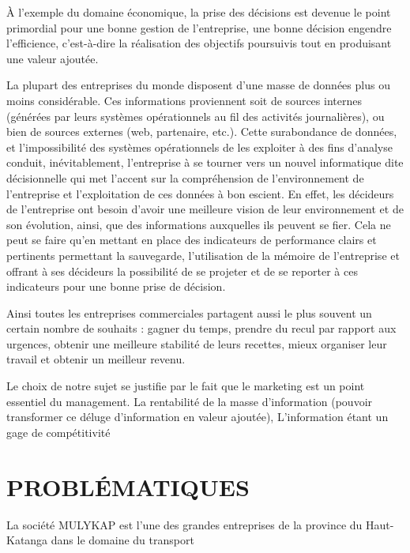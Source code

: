 \documentclass[a4paper,12pt,oneside]{book}
\begin{document}
        À l’exemple du domaine
        économique, la prise des décisions est devenue
        le point primordial pour une bonne gestion de
        l’entreprise, une bonne décision engendre l’efficience,
        c’est-à-dire la réalisation des objectifs
        poursuivis tout en produisant une valeur ajoutée.
        \newline

        La plupart des entreprises du monde disposent d’une masse de données plus ou
        moins considérable. Ces informations proviennent soit de sources internes (générées par
        leurs systèmes opérationnels au fil des activités journalières), ou bien de sources externes
        (web, partenaire, etc.). Cette surabondance de données, et l’impossibilité des systèmes
        opérationnels de les exploiter à des fins d’analyse conduit, inévitablement, l’entreprise à se
        tourner vers un nouvel informatique dite décisionnelle qui met l’accent sur la
        compréhension de l’environnement de l’entreprise et l’exploitation de ces données à bon
        escient. En effet, les décideurs de l’entreprise ont besoin d’avoir une meilleure vision de
        leur environnement et de son évolution, ainsi, que des informations auxquelles ils peuvent
        se fier. Cela ne peut se faire qu’en mettant en place des indicateurs de performance clairs
        et pertinents permettant la sauvegarde, l’utilisation de la mémoire de l’entreprise et offrant
        à ses décideurs la possibilité de se projeter et de se reporter à ces indicateurs pour une bonne
        prise de décision.
        \newline

        Ainsi toutes les entreprises commerciales partagent aussi
        le plus souvent un certain nombre de souhaits : gagner
        du temps, prendre du recul par rapport aux urgences, obtenir une meilleure
        stabilité de leurs recettes, mieux organiser leur travail et obtenir un meilleur
        revenu. \cite*{Barouch2010}
        \newline

        Le choix de notre sujet se justifie par le fait que le marketing
        est un point essentiel du management.
        La rentabilité de la masse d’information (pouvoir transformer
        ce déluge d’information en valeur ajoutée), L’information étant
        un gage de compétitivité %

    \section[Problématique]{PROBLÉMATIQUES}
    La société MULYKAP est l’une des grandes entreprises
    de la province du Haut-Katanga dans le domaine du transport
\end{document}
